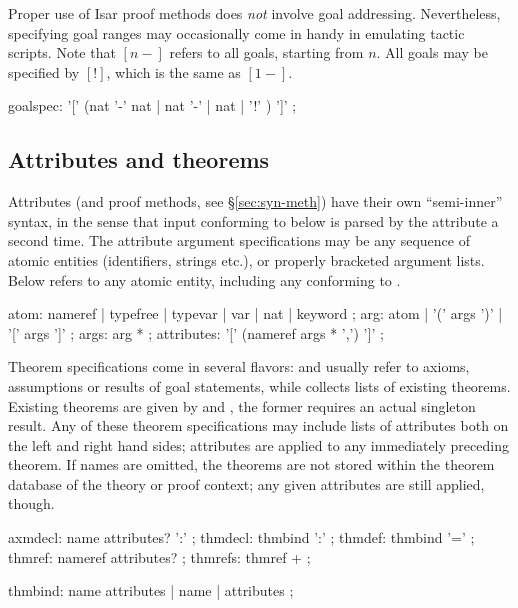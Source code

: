 Proper use of Isar proof methods does \emph{not} involve goal addressing.
Nevertheless, specifying goal ranges may occasionally come in handy in
emulating tactic scripts.  Note that $[n-]$ refers to all goals, starting from
$n$.  All goals may be specified by $[!]$, which is the same as $[1-]$.

\begin{rail}
  goalspec: '[' (nat '-' nat | nat '-' | nat | '!' ) ']'
  ;
\end{rail}


\subsection{Attributes and theorems}\label{sec:syn-att}

Attributes (and proof methods, see \S\ref{sec:syn-meth}) have their own
``semi-inner'' syntax, in the sense that input conforming to
 below is parsed by the attribute a second time.  The
attribute argument specifications may be any sequence of atomic entities
(identifiers, strings etc.), or properly bracketed argument lists.  Below
 refers to any atomic entity, including any
 conforming to .

\begin{rail}
  atom: nameref | typefree | typevar | var | nat | keyword
  ;
  arg: atom | '(' args ')' | '[' args ']'
  ;
  args: arg *
  ;
  attributes: '[' (nameref args * ',') ']'
  ;
\end{rail}

Theorem specifications come in several flavors:  and
 usually refer to axioms, assumptions or results of goal
statements, while  collects lists of existing theorems.
Existing theorems are given by  and ,
the former requires an actual singleton result.  Any of these theorem
specifications may include lists of attributes both on the left and right hand
sides; attributes are applied to any immediately preceding theorem.  If names
are omitted, the theorems are not stored within the theorem database of the
theory or proof context; any given attributes are still applied, though.

\begin{rail}
  axmdecl: name attributes? ':'
  ;
  thmdecl: thmbind ':'
  ;
  thmdef: thmbind '='
  ;
  thmref: nameref attributes?
  ;
  thmrefs: thmref +
  ;

  thmbind: name attributes | name | attributes
  ;
\end{rail}


